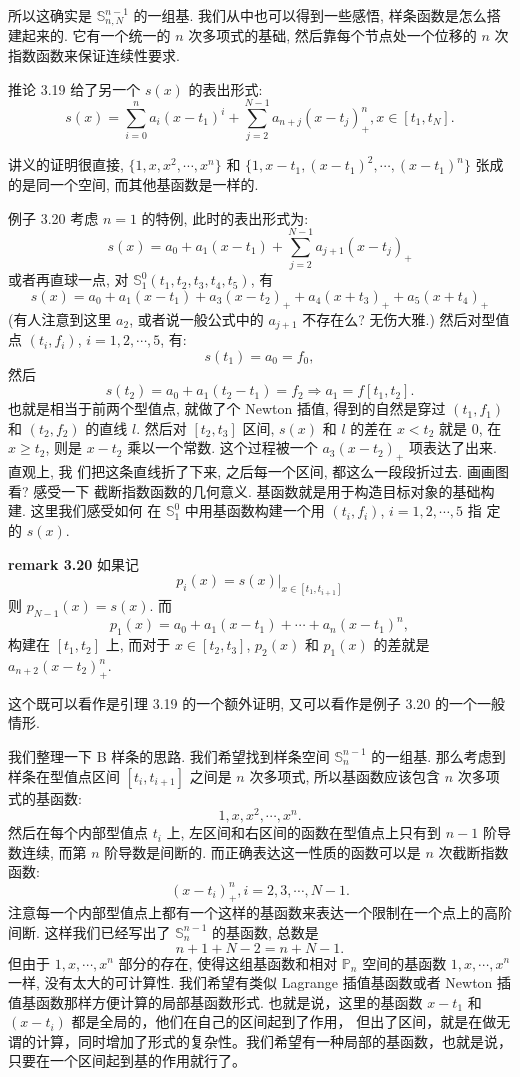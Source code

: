 \documentclass[a4paper]{ctexart}
\begin{document}
{所以这确实是 $\mathbb{S}_{n, N}^{n - 1}$ 的一组基. 我们从中也可以得到一些感悟, 
样条函数是怎么搭建起来的. 它有一个统一的 $n$ 次多项式的基础,
然后靠每个节点处一个位移的 $n$ 次指数函数来保证连续性要求.

推论 3.19 给了另一个 $s(x)$ 的表出形式:
$$
s(x) = \sum_{i = 0}^n a_i(x - t_1)^i + \sum_{j = 2}^{N - 1}a_{n + j}(x - t_j)_+^n,
 x \in [t_1, t_N].
$$

讲义的证明很直接, $\{1, x, x^2, \cdots, x^n\}$ 和 $\{1, x - t_1, (x - t_1)^2, \cdots,
 (x - t_1)^n\}$ 张成的是同一个空间, 而其他基函数是一样的.

例子 3.20 考虑 $n = 1$ 的特例, 此时的表出形式为:
$$
s(x) = a_0 + a_1 (x - t_1) + \sum_{j = 2}^{N - 1} a_{j + 1} (x - t_j)_+
$$
或者再直球一点, 对 $\mathbb{S}_1^0(t_1, t_2, t_3, t_4, t_5)$, 有
$$
s(x) = a_0 + a_1 (x - t_1) + a_3 (x - t_2)_+ + a_4 (x + t_3)_+ + a_5 (x + t_4)_+
$$
(有人注意到这里 $a_2$, 或者说一般公式中的 $a_{j + 1}$ 不存在么? 无伤大雅.)
然后对型值点 $(t_i, f_i)$, $i = 1, 2, \cdots, 5$, 有:
$$
s(t_1) = a_0 = f_0,
$$
然后
$$
s(t_2) = a_0 + a_1 (t_2 - t_1) = f_2 \Rightarrow a_1 = f[t_1, t_2].
$$
也就是相当于前两个型值点, 就做了个 Newton 插值, 得到的自然是穿过
$(t_1, f_1)$ 和 $(t_2, f_2)$ 的直线 $l$. 然后对 $[t_2, t_3]$ 区间,
$s(x)$ 和 $l$ 的差在 $x < t_2$ 就是 $0$, 在 $x \geq t_2$, 则是 $x - t_2$
乘以一个常数. 这个过程被一个 $a_3 (x - t_2)_+$ 项表达了出来. 直观上, 我
们把这条直线折了下来, 之后每一个区间, 都这么一段段折过去. 画画图看? 感受一下
截断指数函数的几何意义. 基函数就是用于构造目标对象的基础构建. 这里我们感受如何
在 $\mathbb{S}_1^0$ 中用基函数构建一个用 $(t_i, f_i)$, $i = 1, 2, \cdots, 5$ 指
定的 $s(x)$.

{\bf remark 3.20} 如果记
$$
p_i(x) = \left.s(x)\right|_{x \in [t_1, t_{i + 1}]} 
$$
则 $p_{N - 1}(x) = s(x)$. 而
$$
p_1(x) = a_0 + a_1(x - t_1) + \cdots + a_n(x - t_1)^n,
$$
构建在 $[t_1, t_2]$ 上, 而对于 $x \in [t_2, t_3]$,
$p_2(x)$ 和 $p_1(x)$ 的差就是$a_{n + 2}(x - t_2)^n_+$.

这个既可以看作是引理 3.19 的一个额外证明, 又可以看作是例子 3.20 的一个一般情形.

我们整理一下 B 样条的思路. 我们希望找到样条空间 $\mathbb{S}_{n}^{n - 1}$ 的一组基.
那么考虑到样条在型值点区间 $[t_i, t_{i + 1}]$ 之间是 $n$ 次多项式, 
所以基函数应该包含 $n$ 次多项式的基函数:
$$
1, x, x^2, \cdots, x^n.
$$ 
然后在每个内部型值点 $t_i$ 上, 左区间和右区间的函数在型值点上只有到 $n - 1$ 阶导数连续,
而第 $n$ 阶导数是间断的. 而正确表达这一性质的函数可以是 $n$ 次截断指数函数: 
$$
(x - t_i)^n_+, i = 2, 3, \cdots, N - 1.
$$
注意每一个内部型值点上都有一个这样的基函数来表达一个限制在一个点上的高阶间断. 
这样我们已经写出了 $\mathbb{S}_{n}^{n - 1}$ 的基函数, 总数是
$$
n + 1 + N - 2 = n + N - 1.
$$
但由于 $1, x, \cdots, x^n$ 部分的存在, 使得这组基函数和相对 $\mathbb{P}_n$ 
空间的基函数 $1, x, \cdots, x^n$ 一样, 没有太大的可计算性. 我们希望有类似
Lagrange 插值基函数或者 Newton 插值基函数那样方便计算的局部基函数形式. 
也就是说，这里的基函数 $x - t_1$ 和 $(x - t_i)$ 都是全局的，他们在自己的区间起到了作用，
但出了区间，就是在做无谓的计算，同时增加了形式的复杂性。我们希望有一种局部的基函数，也就是说，
只要在一个区间起到基的作用就行了。

}
\end{document}
